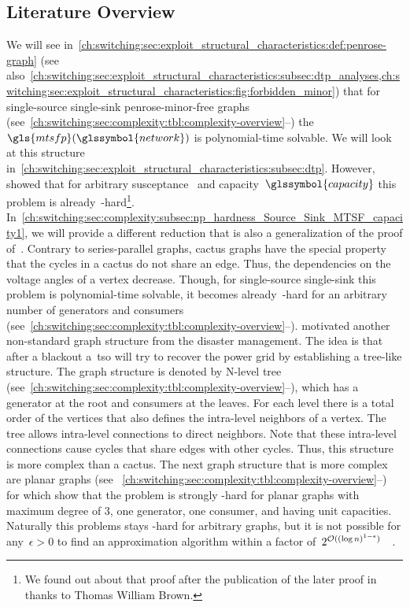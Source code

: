 \subsection{Literature Overview}
\label{ch:switching:sec:complexity:subsec:overview}
% 
We will see
in~\cref{ch:switching:sec:exploit_structural_characteristics:def:penrose-graph}
(see
also~\cref{ch:switching:sec:exploit_structural_characteristics:subsec:dtp_analyses,ch:switching:sec:exploit_structural_characteristics:fig:forbidden_minor})
that for single-source single-sink penrose-minor-free graphs
(see~\cref{ch:switching:sec:complexity:tbl:complexity-overview}--)
the~$\gls{mtsfp}(\glssymbol{network})$ is poly\-no\-mi\-al-time solvable. We
will look at this structure
in~\cref{ch:switching:sec:exploit_structural_characteristics:subsec:dtp}.
However, \textcite{Koc16} showed that for arbitrary
susceptance~ and capacity~$\glssymbol{capacity}$ this
problem is already~\NP-hard\footnote{We found out about that proof after the
publication of the later proof in~
\parencite{Gra18} thanks to Thomas William Brown.}.
In~\cref{ch:switching:sec:complexity:subsec:np_hardness_Source_Sink_MTSF_capacity1},
we will provide a different reduction that is also a generalization of the proof
of~\textcite{Koc16}. Contrary to series-parallel graphs, cactus graphs have the
special property that the cycles in a cactus do not share an edge. Thus, the
dependencies on the voltage angles of a vertex decrease. Though, for
single-source single-sink this problem is polynomial-time solvable, it becomes
already~\NP-hard for an arbitrary number of generators and consumers
(see~\cref{ch:switching:sec:complexity:tbl:complexity-overview}--).
\textcite[pp.8ff.; Section 5]{Leh14} motivated another non-standard graph
structure from the disaster management. The idea is that after a blackout
a~\gls{tso} will try to recover the power grid by establishing a tree-like
structure. The graph structure is denoted by N-level tree
(see~\cref{ch:switching:sec:complexity:tbl:complexity-overview}--),
which has a generator at the root and consumers at the leaves. For each level
there is a total order of the vertices that also defines the intra-level
neighbors of a vertex. The tree allows intra-level connections to direct
neighbors. Note that these intra-level connections cause cycles that share edges
with other cycles. Thus, this structure is more complex than a cactus. The next
graph structure that is more complex are planar graphs (see~
\cref{ch:switching:sec:complexity:tbl:complexity-overview}--) for
which \textcite[p.13; Section 7]{Leh14} show that the problem is strongly
\NP-hard for planar graphs with maximum degree of 3, one generator, one
consumer, and having unit capacities. Naturally this problems stays \NP-hard for
arbitrary graphs, but it is not possible for any~$\epsilon > 0$ to find an
approximation algorithm within a factor of~$2^{\mathcal{O}((\log n)^
{1-\epsilon})}$~\parencite[pp.10ff.]{Leh14}~\parencite[pp.95ff.]{Karger1997}.
% 
